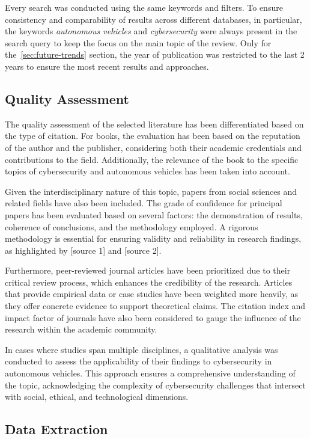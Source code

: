 Every search was conducted using the same keywords and filters.
To ensure consistency and comparability of results across different databases, in particular, the keywords \textit{autonomous vehicles} and \textit{cybersecurity} were always present in the search query to keep the focus on the main topic of the review.
Only for the~\ref{sec:future-trends} section, the year of publication was restricted to the last 2 years to ensure the most recent results and approaches.


\subsection{Quality Assessment}\label{subsec:quality-assessment}
The quality assessment of the selected literature has been differentiated based on the type of citation.
For books, the evaluation has been based on the reputation of the author and the publisher, considering both their academic credentials and contributions to the field.
Additionally, the relevance of the book to the specific topics of cybersecurity and autonomous vehicles has been taken into account.

Given the interdisciplinary nature of this topic, papers from social sciences and related fields have also been included.
The grade of confidence for principal papers has been evaluated based on several factors: the demonstration of results, coherence of conclusions, and the methodology employed.
A rigorous methodology is essential for ensuring validity and reliability in research findings, as highlighted by [source 1] and [source 2].

Furthermore, peer-reviewed journal articles have been prioritized due to their critical review process, which enhances the credibility of the research.
Articles that provide empirical data or case studies have been weighted more heavily, as they offer concrete evidence to support theoretical claims.
The citation index and impact factor of journals have also been considered to gauge the influence of the research within the academic community.

In cases where studies span multiple disciplines, a qualitative analysis was conducted to assess the applicability of their findings to cybersecurity in autonomous vehicles.
This approach ensures a comprehensive understanding of the topic, acknowledging the complexity of cybersecurity challenges that intersect with social, ethical, and technological dimensions.


\subsection{Data Extraction}\label{subsec:data-extraction}

